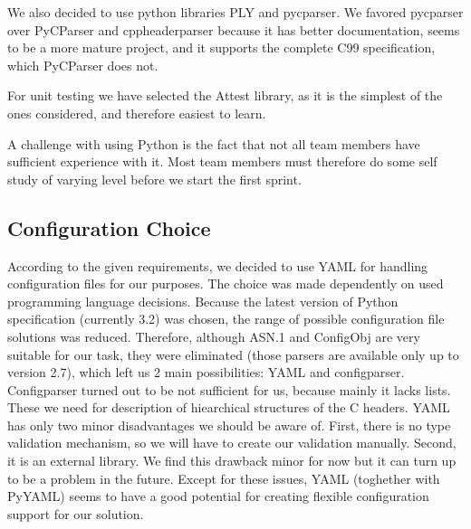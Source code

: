 We also decided to use python libraries PLY and pycparser. We favored pycparser
over PyCParser and cppheaderparser because it has better documentation, seems
to be a more mature project, and it supports the complete C99 specification,
which PyCParser does not.

For unit testing we have selected the Attest library, as it is the simplest of
the ones considered, and therefore easiest to learn.

A challenge with using Python is the fact that not all team members have
sufficient experience with it. Most team members must therefore do some self
study of varying level before we start the first sprint.

\subsection{Configuration Choice}
According to the given requirements, we decided to use YAML for handling
configuration files for our purposes. The choice was made dependently on used
programming language decisions. Because the latest version of Python
specification (currently 3.2) was chosen, the range of possible configuration
file solutions was reduced. Therefore, although ASN.1 and ConfigObj are very
suitable for our task, they were eliminated (those parsers are available only
up to version 2.7), which left us 2 main possibilities: YAML and configparser.
Configparser turned out to be not sufficient for us, because mainly it lacks
lists. These we need for description of hiearchical structures of the C
headers. YAML has only two minor disadvantages we should be aware of. First,
there is no type validation mechanism, so we will have to create our validation
manually. Second, it is an external library. We find this drawback minor for
now but it can turn up to be a problem in the future. Except for these issues,
YAML (toghether with PyYAML) seems to have a good potential for creating
flexible configuration support for our solution.

